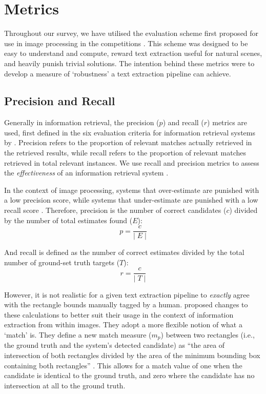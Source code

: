 \section{Metrics}
\label{sec:background:metrics}

Throughout our survey, we have utilised the evaluation scheme first proposed for use in image processing in the  competitions \citep{Lucas:2003iw, Lucas:2005bq, Shahab:2011hq, Karatzas:2013by, Karatzas:2015tj}. This scheme was designed to be easy to understand and compute, reward text extraction useful for natural scenes, and heavily punish trivial solutions. The intention behind these metrics were to develop a measure of `robustness' a text extraction pipeline can achieve.

\subsection{Precision and Recall}
\label{sec:background:metrics:precision_and_recall}

Generally in information retrieval, the precision ($p$) and recall ($r$) metrics are used, first defined in the six evaluation criteria for information retrieval systems by \citet{Cleverdon:1966vd}. Precision refers to the proportion of relevant matches actually retrieved in the retrieved results, while recall refers to the proportion of relevant matches retrieved in total relevant instances. We use recall and precision metrics to assess the \textit{effectiveness} of an information retrieval system \citep{Rijsbergen:1979dw}.

In the context of image processing, systems that over-estimate are punished with a low precision score, while systems that under-estimate are punished with a low recall score \citep{Lucas:2003iw}. Therefore, precision is the number of correct candidates ($c$) divided by the number of total estimates found ($E$):
\begin{equation*}
  p = \frac{c}{\lvert\;E\;\rvert}
\end{equation*}

And recall is defined as the number of correct estimates divided by the total number of ground-set truth targets ($T$):
\begin{equation*}
  r = \frac{c}{\lvert\;T\;\rvert}
\end{equation*}

However, it is not realistic for a given text extraction pipeline to \textit{exactly} agree with the rectangle bounds manually tagged by a human. \citet{Lucas:2003iw} proposed changes to these calculations to better suit their usage in the context of information extraction from within images. They adopt a more flexible notion of what a `match' is. They define a new match measure ($m_{p}$) between two rectangles (i.e., the ground truth and the system's detected candidate) as ``the area of intersection of both rectangles divided by the area of the minimum bounding box containing both rectangles'' \citep{Lucas:2003iw}. This allows for a match value of one when the candidate is identical to the ground truth, and zero where the candidate has no intersection at all to the ground truth.


